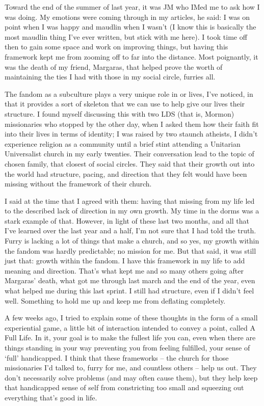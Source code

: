 Toward the end of the summer of last year, it was JM who IMed me to ask how I was doing. My emotions were coming through in my articles, he said: I was on point when I was happy and maudlin when I wasn't (I know this is basically the most maudlin thing I've ever written, but stick with me here). I took time off then to gain some space and work on improving things, but having this framework kept me from zooming off to far into the distance. Most poignantly, it was the death of my friend, Margaras, that helped prove the worth of maintaining the ties I had with those in my social circle, furries all.

The fandom as a subculture plays a very unique role in or lives, I've noticed, in that it provides a sort of skeleton that we can use to help give our lives their structure. I found myself discussing this with two LDS (that is, Mormon) missionaries who stopped by the other day, when I asked them how their faith fit into their lives in terms of identity; I was raised by two staunch atheists, I didn't experience religion as a community until a brief stint attending a Unitarian Universalist church in my early twenties. Their conversation lead to the topic of chosen family, that closest of social circles. They said that their growth out into the world had structure, pacing, and direction that they felt would have been missing without the framework of their church.

I said at the time that I agreed with them: having that missing from my life led to the described lack of direction in my own growth.  My time in the dorms was a stark example of that. However, in light of these last two months, and all that I've learned over the last year and a half, I'm not sure that I had told the truth. Furry is lacking a lot of things that make a church, and so yes, my growth within the fandom was hardly predictable; no mission for me. But that said, it was still just that: growth within the fandom. I have this framework in my life to add meaning and direction. That's what kept me and so many others going after Margaras' death, what got me through last march and the end of the year, even what helped me during this last sprint. I still had structure, even if I didn't feel well. Something to hold me up and keep me from deflating completely.

A few weeks ago, I tried to explain some of these thoughts in the form of a small experiential game, a little bit of interaction intended to convey a point, called A Full Life. In it, your goal is to make the fullest life you can, even when there are things standing in your way preventing you from feeling fulfilled, your sense of `full' handicapped. I think that these frameworks -- the church for those missionaries I'd talked to, furry for me, and countless others -- help us out. They don't necessarily solve problems (and may often cause them), but they help keep that handicapped sense of self from constricting too small and squeezing out everything that's good in life.

